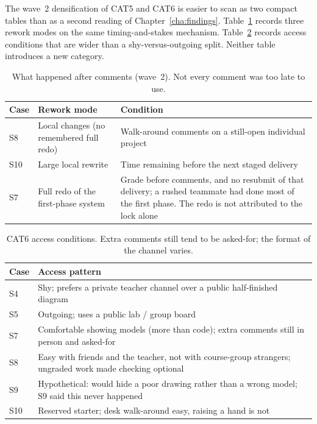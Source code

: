 The wave~2 densification of CAT5 and CAT6 is easier to scan as two compact tables than as a second reading of Chapter~\ref{cha:findings}. Table~\ref{tab:cat5_rework} records three rework modes on the same timing-and-stakes mechanism. Table~\ref{tab:cat6_access} records access conditions that are wider than a shy-versus-outgoing split. Neither table introduces a new category.

\begin{table}[ht]
\centering
\small
\caption{What happened after comments (wave~2). Not every comment was too late to use.}
\label{tab:cat5_rework}
\begin{tabularx}{\textwidth}{l l >{\raggedright\arraybackslash}X}
\toprule
\textbf{Case} & \textbf{Rework mode} & \textbf{Condition} \\
\midrule
S8 & Local changes (no remembered full redo) & Walk-around comments on a still-open individual project \\
S10 & Large local rewrite & Time remaining before the next staged delivery \\
S7 & Full redo of the first-phase system & Grade before comments, and no resubmit of that delivery; a rushed teammate had done most of the first phase. The redo is not attributed to the lock alone \\
\bottomrule
\end{tabularx}
\end{table}

\begin{table}[ht]
\centering
\small
\caption{CAT6 access conditions. Extra comments still tend to be asked-for; the format of the channel varies.}
\label{tab:cat6_access}
\begin{tabularx}{\textwidth}{l >{\raggedright\arraybackslash}X}
\toprule
\textbf{Case} & \textbf{Access pattern} \\
\midrule
S4 & Shy; prefers a private teacher channel over a public half-finished diagram \\
S5 & Outgoing; uses a public lab / group board \\
S7 & Comfortable showing models (more than code); extra comments still in person and asked-for \\
S8 & Easy with friends and the teacher, not with course-group strangers; ungraded work made checking optional \\
S9 & Hypothetical: would hide a poor drawing rather than a wrong model; S9 said this never happened \\
S10 & Reserved starter; desk walk-around easy, raising a hand is not \\
\bottomrule
\end{tabularx}
\end{table}

